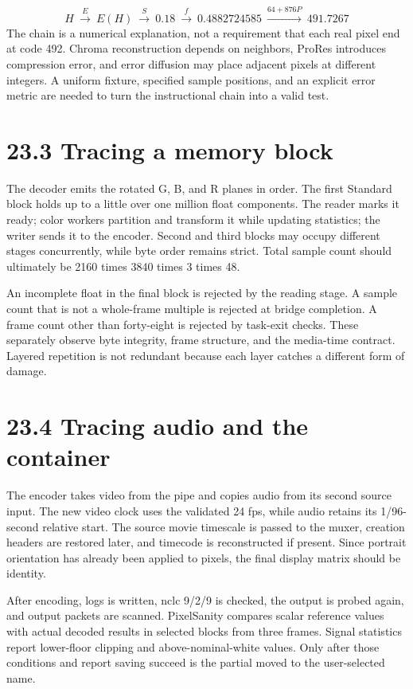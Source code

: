 \documentclass[11pt,a4paper,openany]{book}
\begin{document}
\begin{equation}
H\ \xrightarrow{E}\ E(H)\ \xrightarrow{S}\ 0.18\ \xrightarrow{f}\ 0.4882724585\ \xrightarrow{64+876P}\ 491.7267
\end{equation}
The chain is a numerical explanation, not a requirement that each real pixel end at code 492. Chroma reconstruction depends on neighbors, ProRes introduces compression error, and error diffusion may place adjacent pixels at different integers. A uniform fixture, specified sample positions, and an explicit error metric are needed to turn the instructional chain into a valid test.


\section*{23.3 Tracing a memory block}
The decoder emits the rotated G, B, and R planes in order. The first Standard block holds up to a little over one million float components. The reader marks it ready; color workers partition and transform it while updating statistics; the writer sends it to the encoder. Second and third blocks may occupy different stages concurrently, while byte order remains strict. Total sample count should ultimately be 2160 times 3840 times 3 times 48.

An incomplete float in the final block is rejected by the reading stage. A sample count that is not a whole-frame multiple is rejected at bridge completion. A frame count other than forty-eight is rejected by task-exit checks. These separately observe byte integrity, frame structure, and the media-time contract. Layered repetition is not redundant because each layer catches a different form of damage.


\section*{23.4 Tracing audio and the container}
The encoder takes video from the pipe and copies audio from its second source input. The new video clock uses the validated 24 fps, while audio retains its 1/96-second relative start. The source movie timescale is passed to the muxer, creation headers are restored later, and timecode is reconstructed if present. Since portrait orientation has already been applied to pixels, the final display matrix should be identity.

After encoding, logs is written, nclc 9/2/9 is checked, the output is probed again, and output packets are scanned. PixelSanity compares scalar reference values with actual decoded results in selected blocks from three frames. Signal statistics report lower-floor clipping and above-nominal-white values. Only after those conditions and report saving succeed is the partial moved to the user-selected name.
\end{document}
